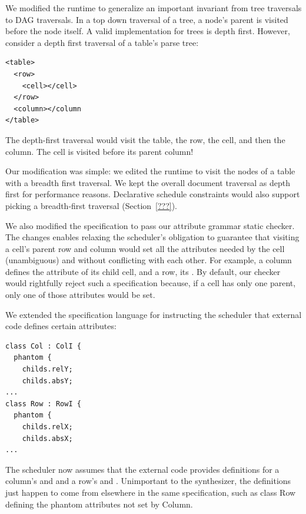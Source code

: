 We modified the runtime to generalize an important invariant from tree traversals to DAG traversals. In a top down traversal of a tree, a node's parent is visited before the node itself. A valid implementation for trees is depth first. However, consider a depth first traversal of a table's parse tree:
\begin{lstlisting}
<table>
  <row>
    <cell></cell> 
  </row>
  <column></column
</table>
\end{lstlisting}
The depth-first traversal would visit the table, the row, the cell, and then the column. The cell is visited before its parent column! 

Our modification was simple: we edited the runtime to visit the nodes of a table with a breadth first traversal. We kept the overall document traversal as depth first for performance reasons. Declarative schedule constraints would also support picking a breadth-first traversal (Section~\ref{???}).

We also modified the specification to pass our attribute grammar static checker. The changes enables relaxing the scheduler's obligation to guarantee that visiting a cell's parent row and column would set all the attributes needed by the cell (unambiguous) and without conflicting with each other. For example, a column defines the  attribute of its child cell, and a row, its . By default, our checker would rightfully reject such a specification because, if a cell has only one parent, only one of those attributes would be set.

We extended the specification language for instructing the scheduler that external code defines certain attributes:
\begin{lstlisting}
class Col : ColI {
  phantom {
    childs.relY;
    childs.absY;
...
class Row : RowI {
  phantom {
    childs.relX;
    childs.absX;
...
\end{lstlisting}
The scheduler now assumes that the external code provides definitions for a column's  and  and a row's  and . Unimportant to the synthesizer, the definitions just happen to come from elsewhere in the same specification, such as class Row defining the phantom attributes not set by Column. %

